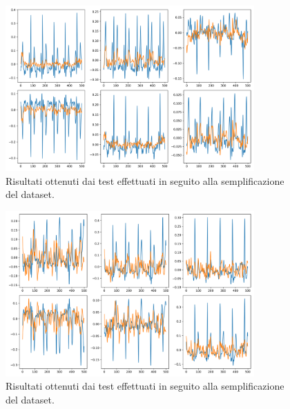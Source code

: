 \begin{figure}[H]
    \centering
    \includegraphics[width=0.85\textwidth]{immagini/prima_cnn_risultati_secondo_plot_0.png}
    \captionsetup{justification=centering}
    \caption{Risultati ottenuti dai test effettuati in seguito alla semplificazione del dataset.}
    \label{fig:prima_cnn_risultati_secondo_plot_0}
\end{figure}
\begin{figure}[H]
    \centering
    \includegraphics[width=0.85\textwidth]{immagini/prima_cnn_risultati_secondo_plot_1.png}
    \captionsetup{justification=centering}
    \caption{Risultati ottenuti dai test effettuati in seguito alla semplificazione del dataset.}
    \label{fig:prima_cnn_risultati_secondo_plot_1}
\end{figure}
